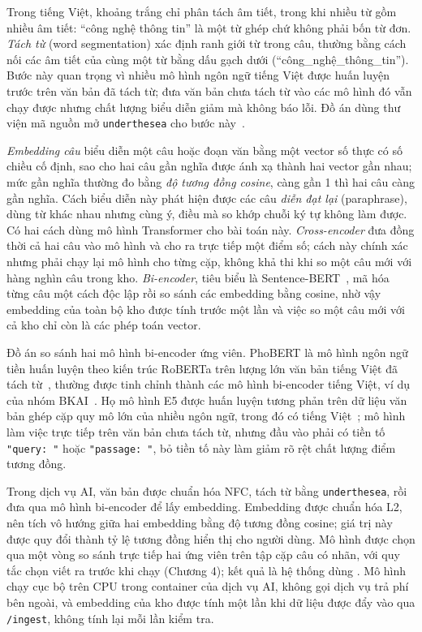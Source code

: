 \documentclass[../main.tex]{subfiles}
\begin{document}
Trong tiếng Việt, khoảng trắng chỉ phân tách âm tiết, trong khi nhiều từ gồm nhiều âm tiết: ``công nghệ thông tin'' là một từ ghép chứ không phải bốn từ đơn. \textit{Tách từ} (word segmentation) xác định ranh giới từ trong câu, thường bằng cách nối các âm tiết của cùng một từ bằng dấu gạch dưới (``công\_nghệ\_thông\_tin''). Bước này quan trọng vì nhiều mô hình ngôn ngữ tiếng Việt được huấn luyện trước trên văn bản đã tách từ; đưa văn bản chưa tách từ vào các mô hình đó vẫn chạy được nhưng chất lượng biểu diễn giảm mà không báo lỗi. Đồ án dùng thư viện mã nguồn mở \texttt{underthesea} cho bước này~\cite{underthesea}.

\textit{Embedding câu} biểu diễn một câu hoặc đoạn văn bằng một vector số thực có số chiều cố định, sao cho hai câu gần nghĩa được ánh xạ thành hai vector gần nhau; mức gần nghĩa thường đo bằng \textit{độ tương đồng cosine}, càng gần 1 thì hai câu càng gần nghĩa. Cách biểu diễn này phát hiện được các câu \textit{diễn đạt lại} (paraphrase), dùng từ khác nhau nhưng cùng ý, điều mà so khớp chuỗi ký tự không làm được. Có hai cách dùng mô hình Transformer cho bài toán này. \textit{Cross-encoder} đưa đồng thời cả hai câu vào mô hình và cho ra trực tiếp một điểm số; cách này chính xác nhưng phải chạy lại mô hình cho từng cặp, không khả thi khi so một câu mới với hàng nghìn câu trong kho. \textit{Bi-encoder}, tiêu biểu là Sentence-BERT~\cite{sbert2019}, mã hóa từng câu một cách độc lập rồi so sánh các embedding bằng cosine, nhờ vậy embedding của toàn bộ kho được tính trước một lần và việc so một câu mới với cả kho chỉ còn là các phép toán vector.

Đồ án so sánh hai mô hình bi-encoder ứng viên. PhoBERT là mô hình ngôn ngữ tiền huấn luyện theo kiến trúc RoBERTa trên lượng lớn văn bản tiếng Việt đã tách từ~\cite{phobert2020}, thường được tinh chỉnh thành các mô hình bi-encoder tiếng Việt, ví dụ  của nhóm BKAI~\cite{bkaibiencoder}. Họ mô hình E5 được huấn luyện tương phản trên dữ liệu văn bản ghép cặp quy mô lớn của nhiều ngôn ngữ, trong đó có tiếng Việt~\cite{e5_2022}; mô hình  làm việc trực tiếp trên văn bản chưa tách từ, nhưng đầu vào phải có tiền tố \texttt{"query: "} hoặc \texttt{"passage: "}, bỏ tiền tố này làm giảm rõ rệt chất lượng điểm tương đồng.

Trong dịch vụ AI, văn bản được chuẩn hóa NFC, tách từ bằng \texttt{underthesea}, rồi đưa qua mô hình bi-encoder để lấy embedding. Embedding được chuẩn hóa L2, nên tích vô hướng giữa hai embedding bằng độ tương đồng cosine; giá trị này được quy đổi thành tỷ lệ tương đồng hiển thị cho người dùng. Mô hình được chọn qua một vòng so sánh trực tiếp hai ứng viên trên tập cặp câu có nhãn, với quy tắc chọn viết ra trước khi chạy (Chương 4); kết quả là hệ thống dùng . Mô hình chạy cục bộ trên CPU trong container của dịch vụ AI, không gọi dịch vụ trả phí bên ngoài, và embedding của kho được tính một lần khi dữ liệu được đẩy vào qua \texttt{/ingest}, không tính lại mỗi lần kiểm tra.
\end{document}
